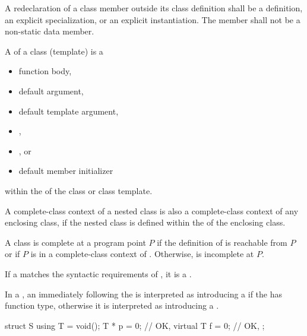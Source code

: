 \pnum
A redeclaration of a class member outside its class definition shall be
a definition,
an explicit specialization, or
an explicit instantiation.
The member shall not be a non-static data member.

\pnum
{}%
A  of a class (template) is a
\begin{itemize}
\item function body,
\item default argument,
\item default template argument,
\item {},
\item {}, or
\item default member initializer
\end{itemize}
within the  of the class or class template.
\begin{note}
A complete-class context of a nested class is also a complete-class
context of any enclosing class, if the nested class is defined within
the  of the enclosing class.
\end{note}

\pnum
A class  is complete at a program point $P$
if the definition of  is reachable from $P$
or if $P$ is in a complete-class context of .
Otherwise,  is incomplete at $P$.

\pnum
If a  matches
the syntactic requirements of ,
it is a .

\pnum
In a ,
an \tcode{=} immediately following the 
is interpreted as introducing a 
if the  has function type,
otherwise it is interpreted as introducing
a .
\begin{example}
\begin{codeblock}
struct S {
  using T = void();
  T * p = 0;        // OK, 
  virtual T f = 0;  // OK, 
};
\end{codeblock}
\end{example}

